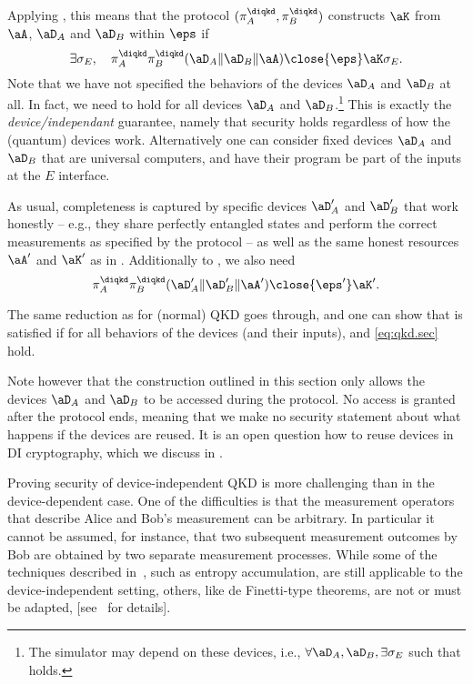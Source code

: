 Applying , this means that the protocol
$(\pi^\diqkd_A,\pi^\diqkd_B)$ constructs $\aK$ from $\aA$, $\aD_A$ and
$\aD_B$ within $\eps$ if
\begin{equation} \label{eq:diqkd}
  \exists \sigma_E, \quad \pi_A^{\diqkd}\pi_B^{\diqkd}(\aD_A \| \aD_B \| \aA)
  \close{\eps} \aK \sigma_E.
\end{equation}
Note that we have not specified the behaviors of the devices $\aD_A$
and $\aD_B$ at all. In fact, we need  to hold for all
devices $\aD_A$ and $\aD_B$.\footnote{The simulator may depend on
  these devices, i.e., $\forall \aD_A, \aD_B, \exists \sigma_E$ such
  that  holds.} This is exactly the
\emph{device\-/independant} guarantee, namely that security holds
regardless of how the (quantum) devices work. Alternatively one can
consider fixed devices $\aD_A$ and $\aD_B$ that are universal
computers, and have their program be part of the inputs at the $E$ interface.

As usual, completeness is captured by specific devices $\aD'_A$ and
$\aD'_B$ that work honestly \--- e.g., they share perfectly entangled
states and perform the correct measurements as specified by the
protocol \--- as well as the same honest resources $\aA'$ and $\aK'$
as in . Additionally to
, we also need
\begin{equation*} %
  \pi_A^{\diqkd}\pi_B^{\diqkd}(\aD'_A \| \aD'_B
  \| \aA') \close{\eps'} \aK'.
\end{equation*}

The same reduction as for (normal) QKD goes through, and one can show
that  is satisfied if for all behaviors of the
devices (and their inputs),  and \eqref{eq:qkd.sec}
hold.

Note however that the construction outlined in this section only
allows the devices $\aD_A$ and $\aD_B$ to be accessed during the
protocol. No access is granted after the protocol ends, meaning that
we make no security statement about what happens if the devices are
reused. It is an open question how to reuse devices in DI
cryptography, which we discuss in .

Proving security of device-independent QKD is more challenging than in
the device-dependent case. One of the difficulties is that the
measurement operators that describe Alice and Bob's measurement can be
arbitrary. In particular it cannot be assumed, for instance, that two
subsequent measurement outcomes by Bob are obtained by two separate
measurement processes. While some of the techniques described
in~, such as entropy accumulation, are
still applicable to the device-independent setting, others, like de
Finetti-type theorems, are not or must be adapted,
[see~\textcite{ArnonThesis} for details].

